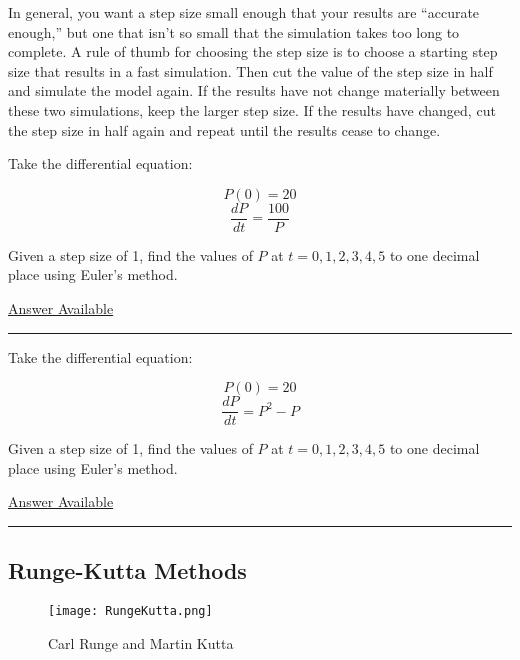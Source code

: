 \documentclass[]{memoir}
\makeatletter
\def\maxwidth{\ifdim\Gin@nat@width>\linewidth\linewidth
\else\Gin@nat@width\fi}
\let\Oldincludegraphics\includegraphics
\renewcommand{\includegraphics}[1]{\Oldincludegraphics[width=\maxwidth]{#1}}
\makeatother
\begin{document}
In general, you want a step size small enough that your results are
``accurate enough,'' but one that isn't so small that the simulation
takes too long to complete. A rule of thumb for choosing the step size
is to choose a starting step size that results in a fast simulation.
Then cut the value of the step size in half and simulate the model
again. If the results have not change materially between these two
simulations, keep the larger step size. If the results have changed, cut
the step size in half again and repeat until the results cease to
change.


Take the differential equation:

\[ P(0) = 20 \] \[ \frac{dP}{dt} = \frac{100}{P} \]

Given a step size of 1, find the values of $P$ at $t=0,1,2,3,4,5$ to one
decimal place using Euler's method.

\hyperref[Ans-10-7]{Answer Available}

\begin{center}\rule{3in}{0.4pt}\end{center}


Take the differential equation:

\[ P(0) = 20 \] \[ \frac{dP}{dt} = P^2 - P \]

Given a step size of 1, find the values of $P$ at $t=0,1,2,3,4,5$ to one
decimal place using Euler's method.

\hyperref[Ans-10-8]{Answer Available}

\begin{center}\rule{3in}{0.4pt}\end{center}

\subsection{Runge-Kutta Methods}

\begin{figure}[htbp]
\centering
\texttt{[image: RungeKutta.png]}
\caption{Carl Runge and Martin Kutta}
\end{figure}
\end{document}
